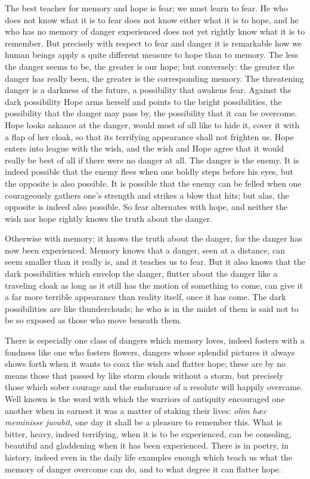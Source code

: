 \documentclass[12pt,a4paper,openany]{book}
\newcommand{\opage}[1]{\marginnote{\footnotesize\textit{[#1]}}}
\begin{document}
The best teacher for memory and hope is fear; we must learn to fear. He who does not know what it is
to fear does not know either what it is to hope, and he who has no memory of danger experienced does
not yet rightly know what it is to remember. But precisely with respect to fear and danger it is
remarkable how we human beings apply a quite different measure to hope than to memory. The less the
danger seems to be, the greater is our hope; but conversely: the greater the danger has really been,
the greater is the corresponding memory. The threatening danger is a darkness of the future, a
possibility that awakens fear. Against the dark possibility Hope arms herself and points to the
bright possibilities, the possibility that the danger may pass by, the possibility that it can be
overcome. Hope looks askance at the danger, would most of all like to hide it, cover it with a flap
of her cloak, so that its terrifying appearance shall not frighten us. Hope enters into league with
the wish, and the wish and Hope agree that it would really be best of all if there were no danger at
all. The danger is the enemy. It is indeed possible that
\setcounter{footnote}{0}%
\opage{6}the enemy flees when one boldly steps before his eyes, but the opposite is also possible. It
is possible that the enemy can be felled when one courageously gathers one's strength and strikes a
blow that hits; but alas, the opposite is indeed also possible. So fear alternates with hope, and
neither the wish nor hope rightly knows the truth about the danger.

Otherwise with memory; it knows the truth about the danger, for the danger has now been experienced.
Memory knows that a danger, seen at a distance, can seem smaller than it really is, and it teaches
us to fear. But it also knows that the dark possibilities which envelop the danger, flutter about the
danger like a traveling cloak as long as it still has the motion of something to come, can give it
a far more terrible appearance than reality itself, once it has come. The dark possibilities are
like thunderclouds; he who is in the midst of them is said not to be so exposed as those who move
beneath them.

There is especially one class of dangers which memory loves, indeed fosters with a fondness like one
who fosters flowers, dangers whose splendid pictures it always shows forth when it wants to coax the
wish and flatter hope; these are by no means those that passed by like storm clouds without a storm,
but precisely those which sober courage and the endurance of a resolute will happily overcame.
Well known is the word with which the warriors of antiquity encouraged one another when in earnest it
was a matter of staking their lives: \textit{olim hæc meminisse juvabit,} one day it shall be a
pleasure to remember this. What is bitter, heavy, indeed terrifying, when it is to be experienced,
can be consoling, beautiful and gladdening when it has been experienced. There is in poetry, in
history, indeed even in the
\setcounter{footnote}{0}%
\opage{7}daily life examples enough which teach us what the memory of danger overcome can do, and to
what degree it can flatter hope.
\end{document}
